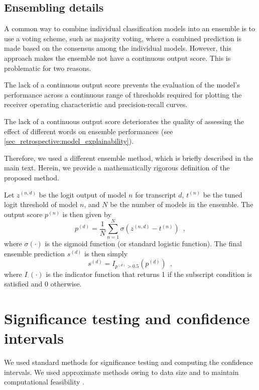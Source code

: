 {\subsection{Ensembling details}

A common way to combine individual classification models into an ensemble is to use a voting scheme, such as majority voting, where a combined prediction is made based on the consensus among the individual models. However, this approach makes the ensemble not have a continuous output score. This is problematic for two reasons.

The lack of a continuous output score prevents the evaluation of the model's performance across a continuous range of thresholds required for plotting the receiver operating characteristic and precision-recall curves.

The lack of a continuous output score deteriorates the quality of assessing the effect of different words on ensemble performances (see \cref{sec_retrospective:model_explainability}).

Therefore, we used a different ensemble method, which is briefly described in the main text. Herein, we provide a mathematically rigorous definition of the proposed method.

Let $z^{(n,d)}$ be the logit output of model $n$ for transcript $d$, $t^{(n)}$ be the tuned logit threshold of model $n$, and $N$ be the number of models in the ensemble. The output score $p^{(n)}$ is then given by 
%
\begin{equation} \label{eq_retrospective:output_score}
    p^{(d)} = \frac{1}{N} \sum_{n=1}^N \sigma\left(z^{(n,d)} - t^{(n)}\right) \enspace ,
\end{equation}
%
where $\sigma(\cdot)$ is the sigmoid function (or standard logistic function). The final ensemble prediction $s^{(d)}$ is then simply 
%
\begin{equation} \label{eq_retrospective:ensemble_prediction}
    s^{(d)} = I_{p^{(d)} > 0.5}\left(p^{(d)}\right) \enspace ,
\end{equation}
%
where $I_{\cdot}(\cdot)$ is the indicator function that returns 1 if the subscript condition is satisfied and 0 otherwise. 


\section{Significance testing and confidence intervals}

We used standard methods for significance testing and computing the confidence intervals. We used approximate methods owing to data size and to maintain computational feasibility \parencite{dwass_modified_1957,eden_validity_1933}.

}
